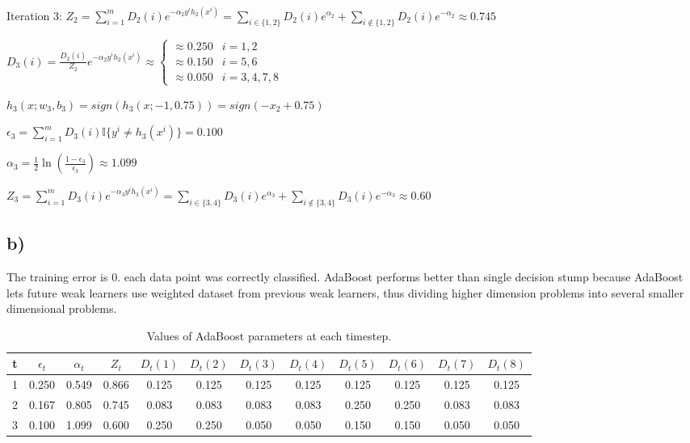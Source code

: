 \documentclass[
]{article}
\begin{document}
Iteration 3:
\(Z_2 = \sum_{i=1}^m D_2(i)e^{-\alpha_2 y^i h_2(x^i)} = \sum_{i\in\{1,2\}} D_2(i)e^{\alpha_2} + \sum_{i\notin \{1,2\}} D_2(i)e^{-\alpha_2} \approx 0.745\)

\(D_3(i) = \frac{D_2(i)}{Z_2}e^{-\alpha_2 y^i h_2(x^i)} \approx \left\{ \begin{array}{lcr} \approx 0.250 & i =1,2 \\ \approx 0.150 & i =5,6 \\ \approx 0.050 & i = 3,4,7,8 \end{array}\right.\)

\(h_3(x; w_3, b_3) = sign(h_3(x; -1, 0.75)) = sign( - x_2 + 0.75)\)

\(\epsilon_3 = \sum_{i=1}^m D_3(i) \mathbb{I}\{y^i \neq h_3 (x^i)\} = 0.100\)

\(\alpha_3 = \frac 1 2 \ln(\frac{1-\epsilon_3}{\epsilon_3}) \approx 1.099\)

\(Z_3 = \sum_{i=1}^m D_3(i)e^{-\alpha_3 y^i h_3(x^i)} = \sum_{i\in\{3,4\}} D_3(i)e^{\alpha_3} + \sum_{i\notin \{3,4\}} D_3(i)e^{-\alpha_3} \approx 0.60\)

\hypertarget{b-1}{%
\subsection{b)}\label{b-1}}

The training error is 0. each data point was correctly classified.
AdaBoost performs better than single decision stump because AdaBoost
lets future weak learners use weighted dataset from previous weak
learners, thus dividing higher dimension problems into several smaller
dimensional problems.

\begin{table}
\begin{center}
\caption{Values of AdaBoost parameters at each timestep.}
\vspace{0.1in}
\begin{tabular}{|c|c|c|c|c|c|c|c|c|c|c|c|}\hline
t & $\epsilon_t$ & $\alpha_t$ & $Z_t$ & $D_t(1)$ & $D_t(2)$ & $D_t(3)$ & $D_t(4)$ & $D_t(5)$ & $D_t(6)$ & $D_t(7)$ & $D_t(8)$ \\\hline
1 & 0.250 & 0.549 & 0.866 &0.125 &0.125 &0.125 &0.125 & 0.125&0.125 &0.125 & 0.125\\
2 & 0.167 & 0.805 & 0.745 & 0.083 & 0.083 & 0.083 & 0.083 & 0.250 & 0.250 & 0.083 & 0.083 \\
3 & 0.100 & 1.099 & 0.600 & 0.250 & 0.250 & 0.050 & 0.050 & 0.150 & 0.150 & 0.050 & 0.050 \\\hline
\end{tabular}
\end{center}
\end{table}
\end{document}

